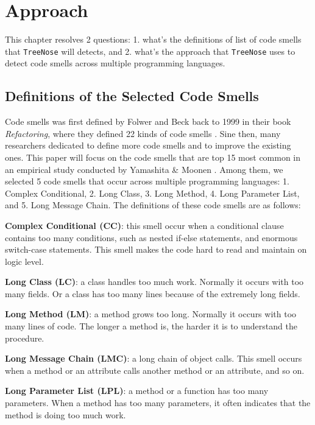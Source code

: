 \section{Approach}
\label{sec:approach}

This chapter resolves 2 questions: 1. what's the definitions of list of code smells that \texttt{TreeNose} will detects, 
and 2. what's the approach that \texttt{TreeNose} uses to detect code smells across multiple programming languages.


\subsection{Definitions of the Selected Code Smells}
\label{sec:Definitions of the Selected Code Smells}

Code smells was first defined by Folwer and Beck back to 1999 in their book \textit{Refactoring}, 
where they defined 22 kinds of code smells \cite{Fowler_Beck}. Sine then, many researchers dedicated to define more 
code smells and to improve the existing ones. This paper will focus on the code smells that are top 15 most common in 
an empirical study conducted by Yamashita \& Moonen \cite{developersCare}.
Among them, we selected 5 code smells that occur across multiple programming languages: 1. Complex Conditional, 2. Long Class,
3. Long Method, 4. Long Parameter List, and 5. Long Message Chain. The definitions of these code smells are as follows:

\textbf{Complex Conditional (CC)}: this smell occur when a conditional clause contains too many conditions, 
such as nested if-else statements, and enormous switch-case statements. This smell makes the code hard to read and maintain on logic level.

\textbf{Long Class (LC)}: a class handles too much work. Normally it occurs with too many fields. Or a class has too many lines because of 
the extremely long fields. 

\textbf{Long Method (LM)}: a method grows too long. Normally it occurs with too many lines of code. The longer a method is, the harder it is to understand the procedure.

\textbf{Long Message Chain (LMC)}: a long chain of object calls. This smell occurs when a method or an attribute calls another method or an attribute, and so on.

\textbf{Long Parameter List (LPL)}: a method or a function has too many parameters. When a method has too many parameters, it often indicates that the method is doing too much work.


